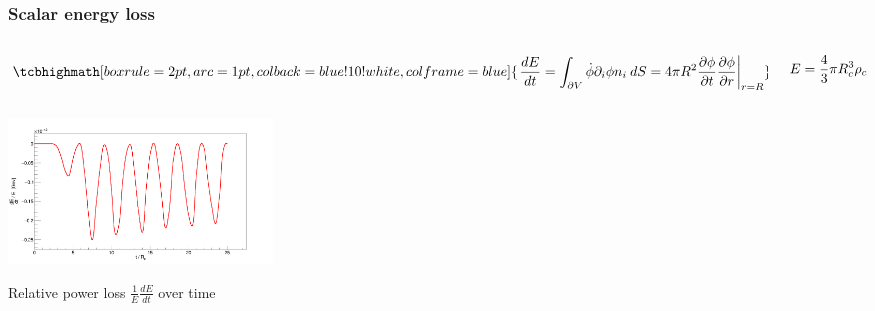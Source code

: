 \documentclass[10pt,t,handout]{beamer}
\begin{document}
\begin{frame}
\frametitle{Scalar energy loss}

\begin{columns}[T]
\begin{column}{0.7\textwidth}
        \begin{equation*}
        \tcbhighmath[boxrule=2pt,arc=1pt,colback=blue!10!white,colframe=blue]{\left.\frac{dE}{dt} = \int_{\partial V}  \Dot{\phi}\partial_i\phi n_i \: dS = 4\pi R^2 \frac{\partial \phi}{\partial t}\frac{\partial\phi}{\partial r}\right\rvert_{r=R}}
    \end{equation*}
\end{column}
\begin{column}{0.3\textwidth}
\vspace{5mm}
    \begin{equation*}
        \small E = \frac{4}{3}\pi R_c^3\rho_c
    \end{equation*} 
\end{column}

\end{columns}
\vspace{1cm}
\begin{columns}[T]
\begin{column}{0.7\textwidth}
    \centering \includegraphics[width=7cm]{Images/Power.png}
    
    \centering \scriptsize Relative power loss $\frac{1}{E}\frac{dE}{dt}$ over time
\end{column}
\begin{column}{0.5\textwidth}
\vspace{2cm}
     \centering\normalsize {}
\end{column}

\end{columns}
\end{frame}
\end{document}
